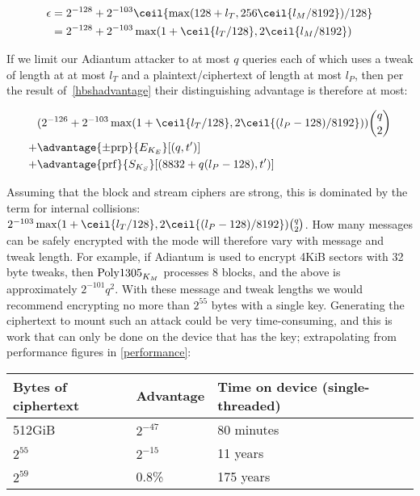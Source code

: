 \documentclass[eprint.tex]{subfiles}
\begin{document}
\begin{align*}
\epsilon &= 2^{-128} + 2^{-103}\ceil{\max(128 + l_T, 256\ceil{l_M/8192})/128}  \\
&= 2^{-128} + 2^{-103}\max(1 + \ceil{l_T/128}, 2\ceil{l_M/8192})
\end{align*}

If we limit our Adiantum attacker to at most $q$ queries each of which uses a tweak of length at
at most $l_T$ and a plaintext/ciphertext of length at most $l_P$, then per the result
of~\autoref{hbshadvantage} their distinguishing advantage is therefore at most:

\begin{align*}
&( 2^{-126} + 2^{-103}\max(1 + \ceil{l_T/128}, 2\ceil{(l_P - 128)/8192}))\binom{q}{2} \\
+& \advantage{\pm \mathrm{prp}}{E_{K_E}}[(q, t')] \\
+& \advantage{\mathrm{prf}}{S_{K_S}}[(8832 + q(l_P - 128), t')] \\
\end{align*}

Assuming that the block and stream ciphers are strong, this is dominated by the
term for internal collisions: $2^{-103}\max(1 + \ceil{l_T/128}, 2\ceil{(l_P -
128)/8192})\binom{q}{2}$. How many messages can be safely encrypted with the
mode will therefore vary with message and tweak length. For example, if Adiantum
is used to encrypt 4KiB sectors with 32 byte tweaks, then $\operatorname{Poly1305}_{K_M}$
processes 8 blocks, and the above is approximately $2^{-101}q^2$. With these
message and tweak lengths we would recommend encrypting no more than $2^{55}$
bytes with a single key. Generating the ciphertext to mount such an attack could
be very time-consuming, and this is work that can only be done on the device
that has the key; extrapolating from performance figures in
\autoref{performance}:

\vspace{0.3cm}
\begin{tabular}{llll}
    Bytes of ciphertext & Advantage & Time on device (single-threaded) \\
    \hline
    512GiB & $2^{-47}$ & 80 minutes  \\
    $2^{55}$ & $2^{-15}$ & 11 years \\
    $2^{59}$ & 0.8\% & 175 years &
\end{tabular}
\vspace{0.3cm}
\end{document}
